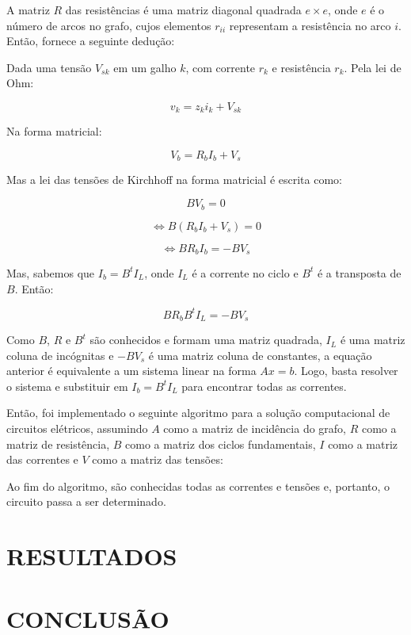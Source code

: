 \documentclass[twocolumn, 10pt]{extarticle}
\begin{document}
A matriz $R$ das resistências é uma matriz diagonal quadrada $e \times e$, onde $e$ é o número de arcos no grafo, cujos elementos $r_{ii}$ representam a resistência no arco $i$. Então, \cite[p. 949]{boruah} fornece a seguinte dedução:

Dada uma tensão $V_{sk}$ em um galho $k$, com corrente $r_k$ e resistência $r_k$. Pela lei de Ohm:

\[
v_k = z_ki_k + V_{sk}
\]

Na forma matricial:

\[
V_b = R_bI_b + V_s
\]

Mas a lei das tensões de Kirchhoff na forma matricial é escrita como:

\[
BV_b = 0
\]

\[
\iff 
B(R_bI_b + V_s) = 0
\]

\[
\iff 
BR_bI_b = -BV_s
\]

Mas, sabemos que $I_b = B^tI_L$, onde $I_L$ é a corrente no ciclo e $B^t$ é a transposta de $B$. Então:

\[
BR_bB^tI_L = -BV_s
\]

Como $B$, $R$ e $B^t$ são conhecidos e formam uma matriz quadrada, $I_L$ é uma matriz coluna de incógnitas e $-BV_s$ é uma matriz coluna de constantes, a equação anterior é equivalente a um sistema linear na forma $Ax = b$. Logo, basta resolver o sistema e substituir em $I_b = B^tI_L$ para encontrar todas as correntes.

Então, foi implementado o seguinte algoritmo para a solução computacional de circuitos elétricos, assumindo $A$ como a matriz de incidência do grafo, $R$ como a matriz de resistência, $B$ como a matriz dos ciclos fundamentais, $I$ como a matriz das correntes e $V$ como a matriz das tensões:

\begingroup
{}\label{cs}
\begin{algorithmic}[1]
	\Else
	\EndIf
\EndFunction
\end{algorithmic}
\hrulefill
\endgroup

Ao fim do algoritmo, são conhecidas todas as correntes e tensões e, portanto, o circuito passa a ser determinado.


\section{RESULTADOS}

\section{CONCLUSÃO}


\renewcommand{\refname}{REFERÊNCIAS}

\end{document}
